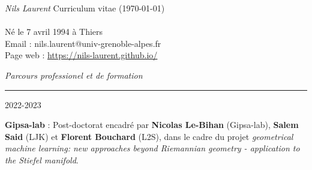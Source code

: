 \documentclass[a4paper,10pt, french]{article}
\begin{document}
\noindent
\textit{\Large \color{Black} Nils Laurent} \hfill {Curriculum vitae (\today)}\\
\vspace{0mm}\\
Né le 7 avril 1994 à Thiers\\
Email : nils.laurent@univ-grenoble-alpes.fr\\
Page web : \url{https://nils-laurent.github.io/}\\
\vspace{5mm}

\noindent
\textit{\Large \color{MyGray} \hspace{5mm} Parcours professionel et de formation}
\vspace{2mm}
{\color{DefaultGray}\hrule height .1pt}
\vspace{4mm}

\noindent
\begin{minipage}{0.20\textwidth}
	\color{MyGray} 2022-2023
\end{minipage}
\hfill
\begin{minipage}{0.70\textwidth}
	\textbf{Gipsa-lab} :  Post-doctorat encadré par \textbf{Nicolas Le-Bihan} (Gipsa-lab), \textbf{Salem Said} (LJK) et \textbf{Florent Bouchard} (L2S), dans le cadre du projet \emph{geometrical machine learning: new approaches beyond Riemannian geometry - application to the Stiefel manifold}.
\end{minipage}\\
\vspace{2mm}
\end{document}
